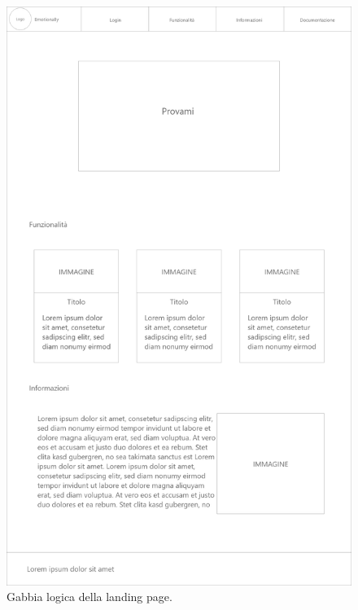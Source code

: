 
\begin{figure}[H]
	\centering
	\caption{Gabbia logica della landing page.}
	\label{fig:gabbie-logiche:landing-page}
	\includegraphics[width=\textwidth]{images/gabbie-logiche/Landing}
\end{figure}

